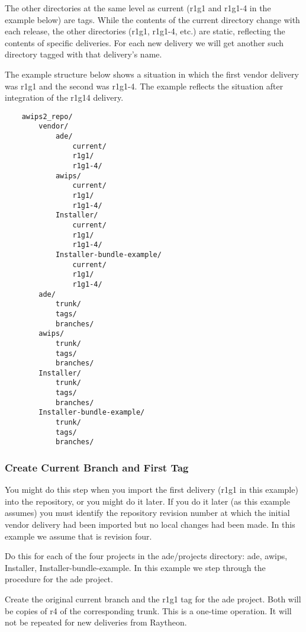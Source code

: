 The other directories at the same level as current (r1g1 and
r1g1-4 in the example below) are tags.  While the contents
of the current directory change with each release, the other
directories (r1g1, r1g1-4, etc.) are static, reflecting the
contents of specific deliveries.  For each new delivery we
will get another such directory tagged with that delivery's
name.

The example structure below shows a situation in which the 
first vendor delivery was r1g1 and the second was r1g1-4.
The example reflects the situation after integration of the 
r1g14 delivery.

\begin{verbatim}
    awips2_repo/
        vendor/
            ade/
                current/
                r1g1/
                r1g1-4/
            awips/
                current/
                r1g1/
                r1g1-4/
            Installer/
                current/
                r1g1/
                r1g1-4/
            Installer-bundle-example/
                current/
                r1g1/
                r1g1-4/
        ade/
            trunk/
            tags/
            branches/
        awips/
            trunk/
            tags/
            branches/
        Installer/
            trunk/
            tags/
            branches/
        Installer-bundle-example/
            trunk/
            tags/
            branches/
\end{verbatim}


\subsubsection{Create Current Branch and First Tag}

You might do this step when you import the first delivery (r1g1
in this example) into the repository, or you might do it later.
If you do it later (as this example assumes) you must identify
the repository revision number at which the initial vendor delivery
had been imported but no local changes had been made.  In this
example we assume that is revision four.

Do this for each of the four projects in the ade/projects
directory: ade, awips, Installer,
Installer-bundle-example.  In this example we step through the
procedure for the ade project.

Create the original current branch and the r1g1 tag for the ade project.
Both will be copies of r4 of the corresponding trunk.  This is a one-time
operation.  It will not be repeated for new deliveries from Raytheon.


